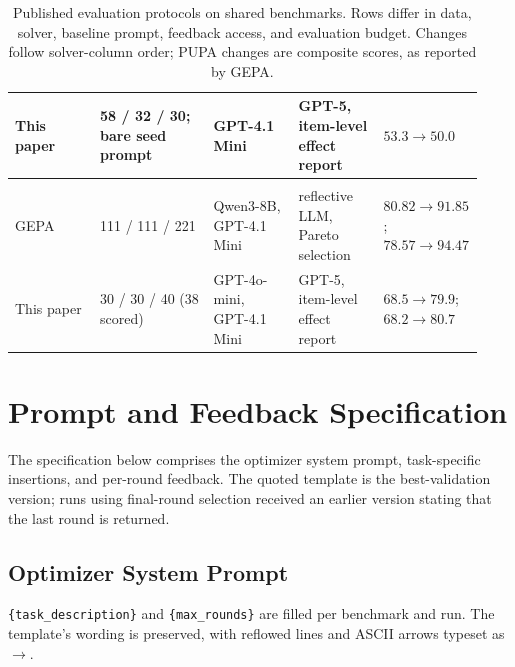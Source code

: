 \documentclass[11pt]{article}
\begin{document}
\begin{table}[htbp]
\begin{tabular}{@{}p{0.18\linewidth}p{0.24\linewidth}p{0.18\linewidth}p{0.18\linewidth}p{0.15\linewidth}@{}}
\rowcolor{softblue}This paper & 58 / 32 / 30; bare seed prompt & GPT-4.1 Mini & GPT-5, item-level effect report & $53.3\rightarrow 50.0$ \\
\midrule
\rowcolor{midgreen}\multicolumn{5}{l}{\textbf{PUPA}} \\
GEPA~\citep{agrawal2026gepa} & 111 / 111 / 221 & Qwen3-8B, GPT-4.1 Mini & reflective LLM, Pareto selection & $80.82\rightarrow 91.85$; $78.57\rightarrow 94.47$ \\
\rowcolor{softblue}This paper & 30 / 30 / 40 (38 scored) & GPT-4o-mini, GPT-4.1 Mini & GPT-5, item-level effect report & $68.5\rightarrow 79.9$; $68.2\rightarrow 80.7$ \\
\bottomrule
\end{tabular}
\caption{Published evaluation protocols on shared benchmarks. Rows differ in data, solver, baseline prompt, feedback
access, and evaluation budget. Changes follow solver-column order; PUPA changes are composite scores, as reported by GEPA.}
\label{tab:prior}
\end{table}

\FloatBarrier
\section{Prompt and Feedback Specification}
\label{app:prompts}
The specification below comprises the optimizer system prompt, task-specific insertions, and per-round feedback.
The quoted template is the best-validation version; runs using final-round selection received an earlier version
stating that the last round is returned.

\subsection{Optimizer System Prompt}
\label{app:sysprompt}
\texttt{\{task\_description\}} and \texttt{\{max\_rounds\}} are filled per benchmark and run. The template's wording is
preserved, with reflowed lines and ASCII arrows typeset as $\rightarrow$.
\end{document}
